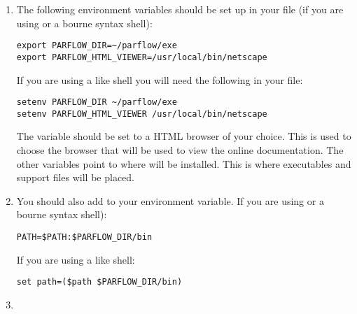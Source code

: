 \begin{enumerate}

\item
The following environment variables should be set up in your 
file (if you are using  or a bourne syntax shell):

\begin{display}\begin{verbatim}
export PARFLOW_DIR=~/parflow/exe
export PARFLOW_HTML_VIEWER=/usr/local/bin/netscape
\end{verbatim}\end{display}

If you are using a  like shell you will need the following in your
 file:

\begin{display}\begin{verbatim}
setenv PARFLOW_DIR ~/parflow/exe
setenv PARFLOW_HTML_VIEWER /usr/local/bin/netscape
\end{verbatim}\end{display}

The  variable should be set to a HTML
browser of your choice.  This is used to choose the browser that will
be used to view the online documentation.  The other variables point
to where \parflow{} will be installed. This is where executables and
support files will be placed.

\item

You should also add  to your 
 environment variable.  
If you are using  or a bourne syntax shell):

\begin{display}\begin{verbatim}
PATH=$PATH:$PARFLOW_DIR/bin
\end{verbatim}\end{display}

If you are using a  like shell:

\begin{display}\begin{verbatim}
set path=($path $PARFLOW_DIR/bin)
\end{verbatim}\end{display}


\item


\end{enumerate}

